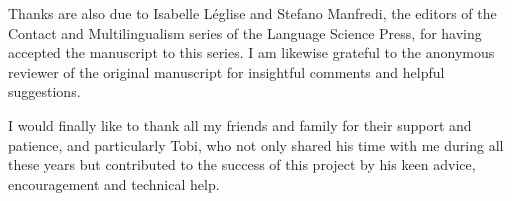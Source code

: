 Thanks are also due to Isabelle Léglise and Stefano Manfredi, the editors of the Contact and Multilingualism  series of the Language Science Press, for having accepted the manuscript to this series. I am likewise grateful to the anonymous reviewer of the original manuscript for insightful comments and helpful suggestions.

I would finally like to thank all my friends and family for their support and patience, and particularly Tobi, who not only shared his time with me during all these years but contributed to the success of this project by his keen advice, encouragement and technical help.